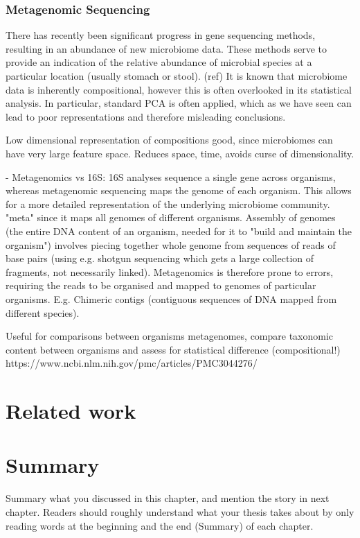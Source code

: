 \subsubsection{Metagenomic Sequencing}
\label{metagenome}




There has recently been significant progress in gene sequencing methods, resulting in an abundance of new microbiome data. These methods serve to provide an indication of the relative abundance of microbial species at a particular location (usually stomach or stool). (ref) It is known that microbiome data is inherently compositional, however this is often overlooked in its statistical analysis. In particular, standard PCA is often applied, which as we have seen can lead to poor representations and therefore misleading conclusions.  

Low dimensional representation of compositions good, since microbiomes can have very large feature space. Reduces space, time, avoids curse of dimensionality. 

- Metagenomics vs 16S: 16S analyses sequence a single gene across organisms, whereas metagenomic sequencing maps the genome of each organism. This allows for a more detailed representation of the underlying microbiome community. "meta" since it maps all genomes of different organisms. Assembly of genomes (the entire DNA content of an organism, needed for it to "build and maintain the organism") involves piecing together whole genome from sequences of reads of base pairs (using e.g. shotgun sequencing which gets a large collection of fragments, not necessarily linked). Metagenomics is therefore prone to errors, requiring the reads to be organised and mapped to genomes of particular organisms. E.g. Chimeric contigs (contiguous sequences of DNA mapped from different species).   

Useful for comparisons between organisms metagenomes, compare taxonomic content between organisms and assess for statistical difference (compositional!) https://www.ncbi.nlm.nih.gov/pmc/articles/PMC3044276/ 








\section{Related work}
\label{sec:relatedwork}




\section{Summary}
Summary what you discussed in this chapter, and mention the story in next
chapter. Readers should roughly understand what your thesis takes about by only reading
words at the beginning and the end (Summary) of each chapter.



